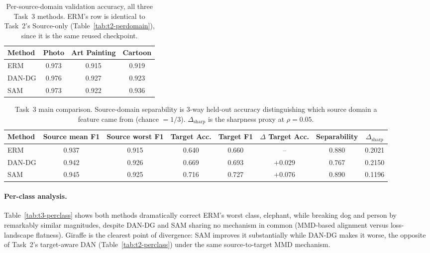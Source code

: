 \documentclass{article}
\begin{document}
\begin{table}[t]
  \caption{Per-source-domain validation accuracy, all three Task~3 methods. ERM's row is identical to Task~2's Source-only (Table~\ref{tab:t2-perdomain}), since it is the same reused checkpoint.}
  \label{tab:t3-perdomain}
  \centering
  \footnotesize
  \begin{tabular}{lccc}
    \toprule
    Method & Photo & Art Painting & Cartoon \\
    \midrule
    ERM     & 0.973 & 0.915 & 0.919 \\
    DAN-DG  & 0.976 & 0.927 & 0.923 \\
    SAM     & 0.973 & 0.922 & 0.936 \\
    \bottomrule
  \end{tabular}
\end{table}

\begin{table}[t]
  \caption{Task~3 main comparison. Source-domain separability is 3-way held-out accuracy distinguishing which source domain a feature came from (chance $=1/3$). $\Delta_\text{sharp}$ is the sharpness proxy at $\rho=0.05$.}
  \label{tab:t3-main}
  \centering
  \footnotesize
  \begin{tabular}{lccccccc}
    \toprule
    Method & Source mean F1 & Source worst F1 & Target Acc. & Target F1 & $\Delta$ Target Acc. & Separability & $\Delta_\text{sharp}$ \\
    \midrule
    ERM     & 0.937 & 0.915 & 0.640 & 0.660 & --       & 0.880 & 0.2021 \\
    DAN-DG  & 0.942 & 0.926 & 0.669 & 0.693 & $+0.029$ & 0.767 & 0.2150 \\
    SAM     & 0.945 & 0.925 & 0.716 & 0.727 & $+0.076$ & 0.890 & 0.1196 \\
    \bottomrule
  \end{tabular}
\end{table}

\paragraph{Per-class analysis.}
Table~\ref{tab:t3-perclass} shows both methods dramatically correct ERM's worst class, elephant, while breaking dog and person by remarkably similar magnitudes, despite DAN-DG and SAM sharing no mechanism in common (MMD-based alignment versus loss-landscape flatness). Giraffe is the clearest point of divergence: SAM improves it substantially while DAN-DG makes it worse, the opposite of Task~2's target-aware DAN (Table~\ref{tab:t2-perclass}) under the same source-to-target MMD mechanism.
\end{document}
